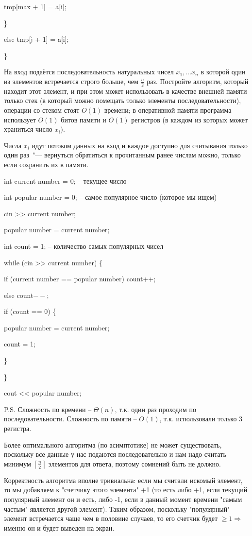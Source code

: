 \documentclass[12pt]{extreport}
\theoremstyle{definiton}
\theoremstyle{definition}
\theoremstyle{definition}
\let\geq\geqslant
\newcounter{problem}
\newcounter{subproblem}
\def\beforPRskip{
	\bigskip
}
\def\prstar{\beforPRskip\noindent\stepcounter{problem}{\bf $\mathbf{\theproblem}^*$\negthickspace.}\setcounter{subproblem}{0}\;}
\begin{document}
		\hspace{8mm} tmp[max + 1] = a[i];
	
	\hspace{4mm} \}

	\hspace{4mm} else tmp[j + 1] = a[i];

	\}

	\prstar На вход подаётся последовательность натуральных чисел $x_1, \ldots x_n$ в которой один из элементов встречается строго больше, чем $\frac{n}{2}$ раз. Постройте алгоритм, который находит этот элемент, и при этом может использовать в качестве внешней памяти только стек (в который можно помещать только элементы последовательности), операции со стеком стоят $O(1)$ времени; в оперативной памяти программа использует $O(1)$ битов памяти и $O(1)$ регистров (в каждом из которых может храниться число $x_i$). 

	Числа $x_i$ идут потоком данных на вход и каждое доступно для считывания только один раз~"--- вернуться  обратиться к прочитанным ранее числам можно, только если сохранить их в памяти.

	int current number = 0;	-- текущее число

	int popular number = 0; -- самое популярное число (которое мы ищем)

	cin >> current number;

	popular number = current number;

	int count = 1; -- количество самых популярных чисел

	while (cin >> current number) \{
	
		\hspace{4mm} if (current number == popular number) count++;

		\hspace{4mm} else count$--$;

		\hspace{4mm} if (count == 0) \{
			
			\hspace{8mm} popular number = current number;

			\hspace{8mm} count = 1;
		
		\hspace{4mm} \}

	\}

	cout << popular number;

	P.S. Сложность по времени -- $\Theta(n)$, т.к. один раз проходим по последовательности. Сложность по памяти -- $O(1)$, т.к. использовали только 3 регистра.

	Более оптимального алгоритма (по асимптотике) не может существовать, поскольку все данные у нас подаются последовательно и нам надо считать минимум $\left\lceil \frac{n}{2} \right\rceil$ элементов для ответа, поэтому сомнений быть не должно.

	Корректность алгоритма вполне тривиальна: если мы считали искомый элемент, то мы добавляем к "счетчику этого элемента" +1 (то есть либо +1, если текущий популярный элемент он и есть, либо -1, если в данный момент времени "самым частым" является другой элемент). Таким образом, поскольку "популярный" элемент встречается чаще чем в половине случаев, то его счетчик будет $\geq 1 \Rightarrow$ именно он и будет выведен на экран.  
\end{document}
